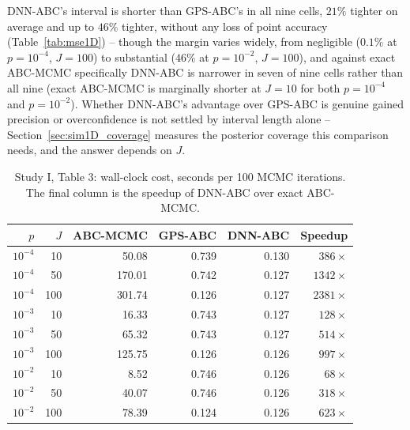 \documentclass[sn-basic,iicol,pdflatex]{sn-jnl}
\begin{document}
DNN-ABC's interval is shorter than GPS-ABC's in all nine cells, $21\%$
tighter on average and up to $46\%$ tighter, without any loss of point
accuracy (Table~\ref{tab:mse1D}) -- though the margin varies widely, from
negligible ($0.1\%$ at $p=10^{-4}$, $J=100$) to substantial ($46\%$ at
$p=10^{-2}$, $J=100$), and against exact ABC-MCMC specifically DNN-ABC is
narrower in seven of nine cells rather than all nine (exact ABC-MCMC is
marginally shorter at $J=10$ for both $p=10^{-4}$ and $p=10^{-2}$). Whether
DNN-ABC's advantage over GPS-ABC is genuine gained precision or overconfidence
is not settled by interval length alone -- Section~\ref{sec:sim1D_coverage}
measures the posterior coverage this comparison needs, and the answer depends
on $J$.

\begin{table}[t]
\centering
\caption{Study I, Table 3: wall-clock cost, seconds per 100 MCMC iterations.
The final column is the speedup of DNN-ABC over exact ABC-MCMC.}
\label{tab:time1D}
\begin{tabular}{rrrrrr}
\toprule
$p$ & $J$ & ABC-MCMC & GPS-ABC & DNN-ABC & Speedup \\
\midrule
$10^{-4}$ & 10  & 50.08  & 0.739 & 0.130 & $386\times$ \\
$10^{-4}$ & 50  & 170.01 & 0.742 & 0.127 & $1342\times$ \\
$10^{-4}$ & 100 & 301.74 & 0.126 & 0.127 & $2381\times$ \\
$10^{-3}$ & 10  & 16.33  & 0.743 & 0.127 & $128\times$ \\
$10^{-3}$ & 50  & 65.32  & 0.743 & 0.127 & $514\times$ \\
$10^{-3}$ & 100 & 125.75 & 0.126 & 0.126 & $997\times$ \\
$10^{-2}$ & 10  & 8.52   & 0.746 & 0.126 & $68\times$ \\
$10^{-2}$ & 50  & 40.07  & 0.746 & 0.126 & $318\times$ \\
$10^{-2}$ & 100 & 78.39  & 0.124 & 0.126 & $623\times$ \\
\bottomrule
\end{tabular}
\end{table}
\end{document}
